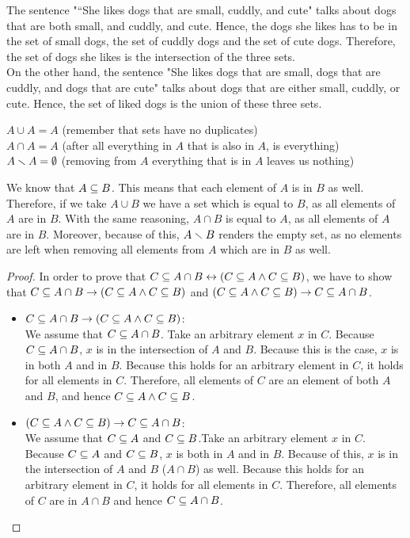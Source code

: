 \begin{solutions}
	\solution The sentence "“She likes dogs that are small, cuddly, and cute" talks about dogs that are both small, and cuddly, and cute. Hence, the dogs she likes has to be in the set of small dogs, the set of cuddly dogs and the set of cute dogs. Therefore, the set of dogs she likes is the intersection of the three sets.\\
	On the other hand, the sentence "She likes dogs that are
	small, dogs that are cuddly, and dogs that are cute" talks about dogs that are either small, cuddly, or cute. Hence, the set of liked dogs is the union of these three sets.

	\solution $A \cup A = A$ (remember that sets have no duplicates)\\
	$A \cap A = A$ (after all everything in $A$ that is also in $A$, is everything)\\
	$A \smallsetminus A = \emptyset$ (removing from $A$ everything that is in $A$ leaves us nothing)

	\solution
	We know that $A\subseteq B$. This means that each element of $A$ is in $B$ as well. Therefore, if we take $A\cup B$ we have a set which is equal to $B$, as all elements of $A$ are in $B$. With the same reasoning, $A\cap B$ is equal to $A$, as all elements of $A$ are in $B$. Moreover, because of this, $A\smallsetminus B$ renders the empty set, as no elements are left when removing all elements from $A$ which are in $B$ as well.

	\solution
	\begin{proof}
		In order to prove that $C\subseteq A\cap B\leftrightarrow (C\subseteq A\land C\subseteq B)$, we have to show that $C\subseteq A\cap B\rightarrow (C\subseteq A\land C\subseteq B)$ and $(C\subseteq A\land C\subseteq B)\rightarrow C\subseteq A\cap B$.
		\begin{itemize}
			\item $C\subseteq A\cap B\rightarrow (C\subseteq A\land C\subseteq B)$:\\
				We assume that $C\subseteq A\cap B$. Take an arbitrary element $x$ in $C$. Because $C\subseteq A\cap B$, $x$ is in the intersection of $A$ and $B$. Because this is the case, $x$ is in both $A$ and in $B$. Because this holds for an arbitrary element in $C$, it holds for all elements in $C$. Therefore, all elements of $C$ are an element of both $A$ and $B$, and hence $C\subseteq A\land C\subseteq B$.
			\item $(C\subseteq A\land C\subseteq B)\rightarrow C\subseteq A\cap B$:\\
				We assume that $C\subseteq A$ and $C\subseteq B$.Take an arbitrary element $x$ in $C$. Because $C\subseteq A$ and $C\subseteq B$, $x$ is both in $A$ and in $B$. Because of this, $x$ is in the intersection of $A$ and $B$ ($A\cap B$) as well. Because this holds for an arbitrary element in $C$, it holds for all elements in $C$. Therefore, all elements of $C$ are in $A\cap B$ and hence $C\subseteq A\cap B$.
		\end{itemize}
	\end{proof}


\end{solutions}
